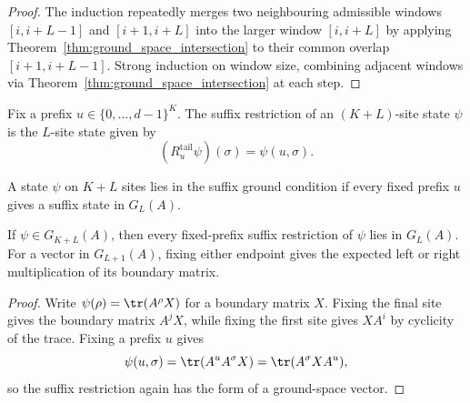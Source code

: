 \begin{proof}
    \leanok
    The induction repeatedly merges two neighbouring admissible windows
    $[i,i+L-1]$ and $[i+1,i+L]$ into the larger window $[i,i+L]$ by applying
    Theorem~\ref{thm:ground_space_intersection} to their common overlap
    $[i+1,i+L-1]$.
    Strong induction on window size, combining adjacent windows via
    Theorem~\ref{thm:ground_space_intersection} at each step.
\end{proof}

\begin{definition}\label{def:tail_restrict_parent}
    \leanok
    Fix a prefix \(u\in\{0,\ldots,d-1\}^K\). The suffix restriction of an
    $(K+L)$-site state $\psi$ is the $L$-site state given by
    \[
        (R^{\mathrm{tail}}_u\psi)(\sigma) = \psi(u,\sigma).
    \]
\end{definition}

\begin{definition}\label{def:in_tail_ground}
    \leanok
    A state $\psi$ on $K+L$ sites lies in the suffix ground condition if every
    fixed prefix $u$ gives a suffix state in $G_L(A)$.
\end{definition}

\begin{lemma}\label{lem:ground_space_in_tail_ground}
    \leanok
    If $\psi \in G_{K+L}(A)$, then every fixed-prefix suffix restriction of
    $\psi$ lies in $G_L(A)$. For a vector in $G_{L+1}(A)$, fixing either
    endpoint gives the expected left or right multiplication of its boundary
    matrix.
\end{lemma}

\begin{proof}
    \leanok
    Write $\psi(\rho) = \tr(A^\rho X)$ for a boundary matrix $X$. Fixing the
    final site gives the boundary matrix $A^jX$, while fixing the first site
    gives $XA^i$ by cyclicity of the trace. Fixing a prefix $u$ gives
    \[
        \psi(u,\sigma) = \tr(A^u A^\sigma X) = \tr(A^\sigma X A^u),
    \]
    so the suffix restriction again has the form of a ground-space vector.
\end{proof}

